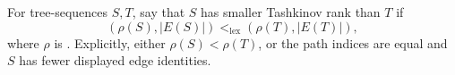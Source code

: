 \begin{definition}
For tree-sequences \(S,T\), say that \(S\) has smaller Tashkinov rank than
\(T\) if
\[
  (\rho(S),|E(S)|)<_{\mathrm{lex}}(\rho(T),|E(T)|),
\]
where \(\rho\) is .  Explicitly, either
\(\rho(S)<\rho(T)\), or the path indices are equal and \(S\) has fewer
displayed edge identities.
\end{definition}
